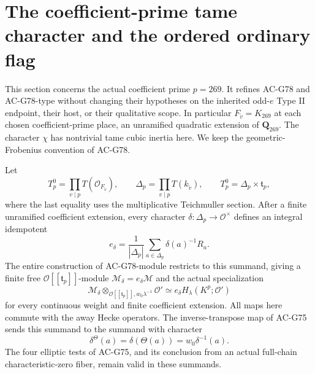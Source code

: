 \section{The coefficient-prime tame character and the ordered ordinary flag}
\label{sec:cubic-coefficient-tame-refinement}

This section concerns the actual coefficient prime \(p=269\).
It refines AC-G78 and AC-G78-type without changing their
hypotheses on the inherited odd-\(e\) Type II endpoint, their
host, or their qualitative scope.  In particular
\(F_{\widetilde v}=K_{269}\) at each chosen coefficient-prime
place, an unramified quadratic extension of \(\mathbf Q_{269}\).
The character \(\chi\) has nontrivial tame cubic inertia here.
We keep the geometric-Frobenius convention of AC-G78.

\begin{lemma}
\label{lem:G79-torus}
Let
\[
 T_p^0=\prod_{v\mid p}T(\mathcal O_{F_{\widetilde v}}),
 \qquad
 \Delta_p=\prod_{v\mid p}T(k_{\widetilde v}),
 \qquad
 T_p^0=\Delta_p\times\mathfrak t_p,
 \tag{G79.1}
\]
where the last equality uses the multiplicative Teichmuller
section.  After a finite unramified coefficient extension,
every character \(\delta:\Delta_p\to\mathcal O^\times\)
defines an integral idempotent
\[
 e_\delta=\frac1{|\Delta_p|}
                 \sum_{a\in\Delta_p}\delta(a)^{-1}R_a.
 \tag{G79.2}
\]
The entire construction of AC-G78-module restricts to this
summand, giving a finite free
\(\mathcal O[[\mathfrak t_p]]\)-module
\(\mathscr M_\delta=e_\delta\mathscr M\) and the actual
specialization
\[
 \mathscr M_\delta\otimes_{\mathcal O[[\mathfrak t_p]],
                         w_0\lambda^{-1}}\mathcal O'
       \simeq e_\delta H_\lambda(K^p;\mathcal O')
 \tag{G79.3}
\]
for every continuous weight and finite coefficient extension.
All maps here commute with the away Hecke operators.
The inverse-transpose map of AC-G75 sends this summand to
the summand with character
\[
                   \delta^\Theta(a)=\delta(\Theta(a))
                                    =w_0\delta^{-1}(a).
 \tag{G79.4}
\]
The four elliptic tests of AC-G75, and its conclusion from an
actual full-chain characteristic-zero fiber, remain valid
in these summands.
\end{lemma}

